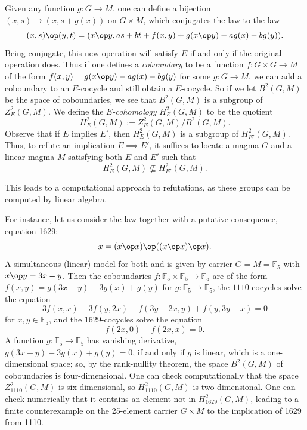 Given any function $g: G \to M$, one can define a bijection $(x,s) \mapsto (x,s+g(x))$ on $G \times M$, which conjugates the law  to the law
$$ (x,s) \op (y,t) = (x \op y, as + bt + f(x,y) + g(x \op y) - ag(x) - bg(y)).$$
Being conjugate, this new operation will satisfy $E$ if and only if the original operation does.
Thus if one defines a \emph{coboundary} to be a function $f: G \times G \to M$ of the form $f(x,y) =g(x \op y) - ag(x) - bg(y)$ for some $g: G \to M$, we can add a coboundary to an $E$-cocycle and still obtain a $E$-cocycle.  So if we let $B^2(G,M)$ be the space of coboundaries, we see that $B^2(G,M)$ is a subgroup of $Z^2_E(G,M)$.  We define the \emph{$E$-cohomology} $H^2_E(G,M)$ to be the quotient
$$ H^2_E(G,M) := Z^2_E(G,M) / B^2(G,M).$$
Observe that if $E$ implies $E'$, then $H^2_E(G,M)$ is a subgroup of $H^2_{E'}(G,M)$.  Thus, to refute an implication $E \implies E'$, it suffices to locate a magma $G$ and a linear magma $M$ satisfying both $E$ and $E'$ such that
\begin{equation}\label{hgm}
  H^2_E(G,M) \not\subseteq H^2_{E'}(G,M).
\end{equation}

This leads to a computational approach to refutations, as these groups can be computed by linear algebra.

For instance, let us consider the law  together with a putative consequence, equation 1629:
\begin{equation}\label{1629}
  x = (x \op x) \op ((x \op x) \op x).
\end{equation}
A simultaneous (linear) model for both  and  is given by carrier $G=M={\mathbb F}_5$ with $x \op y = 3x-y$.  Then the coboundaries $f: {\mathbb F}_5 \times {\mathbb F}_5 \to {\mathbb F}_5$ are of the form $f(x,y) = g(3x-y) - 3g(x) + g(y)$ for $g: {\mathbb F}_5 \to {\mathbb F}_5$, the $1110$-cocycles solve the equation
$$3 f(x,x) - 3 f(y, 2x) - f(3y - 2x, y) + f( y, 3y - x) = 0$$
for $x,y \in {\mathbb F}_5$, and the $1629$-cocycles solve the equation
$$ f(2x,0) - f(2x,x) = 0.$$
A function $g:{\mathbb F}_5 \to {\mathbb F}_5$ has vanishing derivative, $g(3x-y) - 3g(x) + g(y) = 0$, if and only if $g$ is linear, which is a one-dimensional space; so, by the rank-nullity theorem, the space $B^2(G,M)$ of coboundaries is four-dimensional.  One can check computationally that the space $Z^2_{1110}(G,M)$ is six-dimensional, so $H^2_{1110}(G,M)$ is two-dimensional.  One can check numerically that it contains an element not in $H^2_{1629}(G,M)$, leading to a finite counterexample on the 25-element carrier $G \times M$ to the implication of 1629 from 1110.

